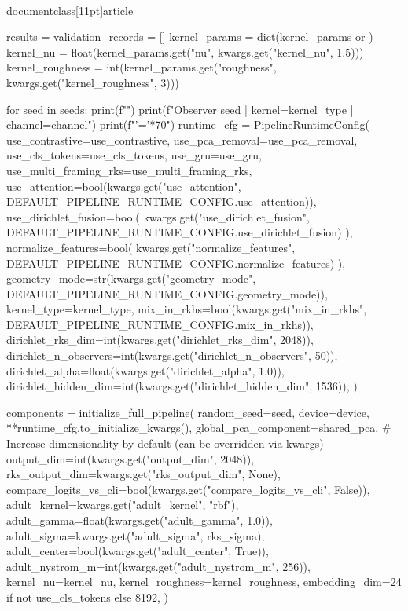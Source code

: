 \\documentclass[11pt]{article}
\begin{document}
\begin{CodeBlock}
    results = {}
    validation_records = []
    kernel_params = dict(kernel_params or {})
    kernel_nu = float(kernel_params.get("nu", kwargs.get("kernel_nu", 1.5)))
    kernel_roughness = int(kernel_params.get("roughness", kwargs.get("kernel_roughness", 3)))
    
    for seed in seeds:
        print(f"")
        print(f"Observer {seed} | kernel={kernel_type} | channel={channel}")
        print(f"{'='*70}")
        runtime_cfg = PipelineRuntimeConfig(
            use_contrastive=use_contrastive,
            use_pca_removal=use_pca_removal,
            use_cls_tokens=use_cls_tokens,
            use_gru=use_gru,
            use_multi_framing_rks=use_multi_framing_rks,
            use_attention=bool(kwargs.get("use_attention", DEFAULT_PIPELINE_RUNTIME_CONFIG.use_attention)),
            use_dirichlet_fusion=bool(
                kwargs.get("use_dirichlet_fusion", DEFAULT_PIPELINE_RUNTIME_CONFIG.use_dirichlet_fusion)
            ),
            normalize_features=bool(
                kwargs.get("normalize_features", DEFAULT_PIPELINE_RUNTIME_CONFIG.normalize_features)
            ),
            geometry_mode=str(kwargs.get("geometry_mode", DEFAULT_PIPELINE_RUNTIME_CONFIG.geometry_mode)),
            kernel_type=kernel_type,
            mix_in_rkhs=bool(kwargs.get("mix_in_rkhs", DEFAULT_PIPELINE_RUNTIME_CONFIG.mix_in_rkhs)),
            dirichlet_rks_dim=int(kwargs.get("dirichlet_rks_dim", 2048)),
            dirichlet_n_observers=int(kwargs.get("dirichlet_n_observers", 50)),
            dirichlet_alpha=float(kwargs.get("dirichlet_alpha", 1.0)),
            dirichlet_hidden_dim=int(kwargs.get("dirichlet_hidden_dim", 1536)),
        )

        components = initialize_full_pipeline(
            random_seed=seed,
            device=device,
            **runtime_cfg.to_initialize_kwargs(),
            global_pca_component=shared_pca,
            # Increase dimensionality by default (can be overridden via kwargs)
            output_dim=int(kwargs.get("output_dim", 2048)),
            rks_output_dim=kwargs.get("rks_output_dim", None),
            compare_logits_vs_cli=bool(kwargs.get("compare_logits_vs_cli", False)),
            adult_kernel=kwargs.get("adult_kernel", "rbf"),
            adult_gamma=float(kwargs.get("adult_gamma", 1.0)),
            adult_sigma=kwargs.get("adult_sigma", rks_sigma),
            adult_center=bool(kwargs.get("adult_center", True)),
            adult_nystrom_m=int(kwargs.get("adult_nystrom_m", 256)),
            kernel_nu=kernel_nu,
            kernel_roughness=kernel_roughness,
            embedding_dim=24 if not use_cls_tokens else 8192,
        )
        

\end{CodeBlock}
\end{document}
